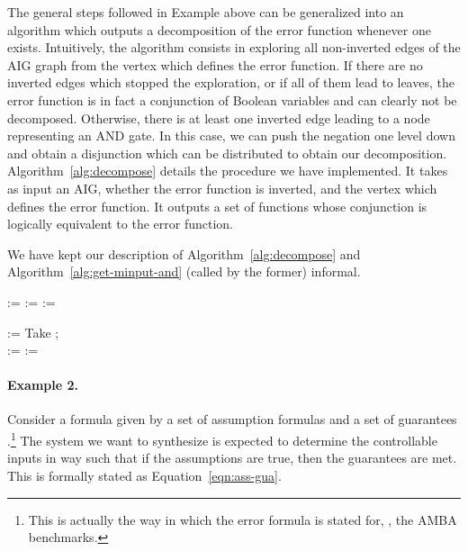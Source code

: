 \documentclass[submission,copyright,creativecommons]{eptcs}
\begin{document}
The general steps followed in Example  above can be generalized into an
algorithm which outputs a decomposition of the error function whenever one
exists. Intuitively, the algorithm consists in exploring all non-inverted edges
of the AIG graph from the vertex which defines the error function. If there are
no inverted edges which stopped the exploration, or if all of them lead to
leaves, the error function is in fact a conjunction of Boolean variables and can
clearly not be decomposed. Otherwise, there is at least one inverted edge
leading to a node representing an AND gate.  In this case, we can push the
negation one level down and obtain a disjunction which can be distributed to
obtain our decomposition. Algorithm~\ref{alg:decompose} details the procedure we
have implemented. It takes as input an AIG, whether the error function is
inverted, and the vertex  which defines the error function. It outputs a
set of functions whose conjunction is logically equivalent to the error
function.

We have kept our description of Algorithm~\ref{alg:decompose} and
Algorithm~\ref{alg:get-minput-and} (called by the former) informal.


\begin{algorithm}
	\small
	 := \;
	 := \;
	 := \;
	\Return{}
\caption{}
\label{alg:get-minput-and}
\end{algorithm}

\begin{algorithm}
	\small
	 := \;
	\If{}
	{
		\Return{  }
	}
	{
	}
Take ; \\
	 := \;
	 := \;
	\Return{  }
\caption{}
\label{alg:decompose}
\end{algorithm}

\paragraph{Example 2.} Consider a formula given by a set of assumption
formulas  and a set of guarantees 
.\footnote{This is actually the way in
	which the error formula is stated for, \eg, the \textsf{AMBA}
	benchmarks.}
The system we want to synthesize is expected to determine the
controllable inputs in way such that if the assumptions are true, then the
guarantees are met. This is formally stated as Equation~\ref{eqn:ass-gua}.
\end{document}

